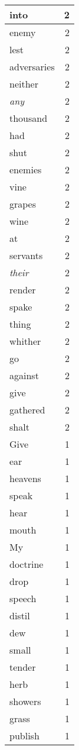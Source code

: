 \begin{center}
\begin{longtable}{l|r}
into & 2 \\ \hline
enemy & 2 \\ \hline
lest & 2 \\ \hline
adversaries & 2 \\ \hline
neither & 2 \\ \hline
\emph{any} & 2 \\ \hline
thousand & 2 \\ \hline
had & 2 \\ \hline
shut & 2 \\ \hline
enemies & 2 \\ \hline
vine & 2 \\ \hline
grapes & 2 \\ \hline
wine & 2 \\ \hline
at & 2 \\ \hline
servants & 2 \\ \hline
\emph{their} & 2 \\ \hline
render & 2 \\ \hline
spake & 2 \\ \hline
thing & 2 \\ \hline
whither & 2 \\ \hline
go & 2 \\ \hline
against & 2 \\ \hline
give & 2 \\ \hline
gathered & 2 \\ \hline
shalt & 2 \\ \hline
Give & 1 \\ \hline
ear & 1 \\ \hline
heavens & 1 \\ \hline
speak & 1 \\ \hline
hear & 1 \\ \hline
mouth & 1 \\ \hline
My & 1 \\ \hline
doctrine & 1 \\ \hline
drop & 1 \\ \hline
speech & 1 \\ \hline
distil & 1 \\ \hline
dew & 1 \\ \hline
small & 1 \\ \hline
tender & 1 \\ \hline
herb & 1 \\ \hline
showers & 1 \\ \hline
grass & 1 \\ \hline
publish & 1 \\ \hline

\end{longtable}
\end{center}
